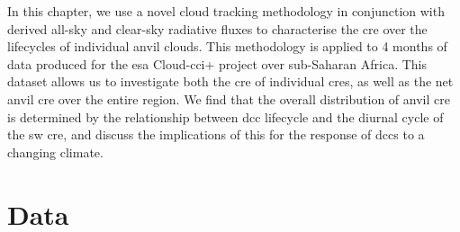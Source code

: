 
In this chapter, we use a novel cloud tracking methodology in conjunction with derived all-sky and clear-sky radiative fluxes to characterise the \acrshort{cre} over the lifecycles of individual anvil clouds. 
This methodology is applied to 4 months of data produced for the \acrshort{esa} Cloud-\acrfull{cci}+ project over sub-Saharan Africa. 
This dataset allows us to investigate both the \acrshort{cre} of individual \acrshort{cre}s, as well as the net anvil \acrshort{cre} over the entire region. 
We find that the overall distribution of anvil \acrshort{cre} is determined by the relationship between \acrshort{dcc} lifecycle and the diurnal cycle of the \acrshort{sw} \acrshort{cre}, and discuss the implications of this for the response of \acrshort{dcc}s to a changing climate.



\section{Data}


